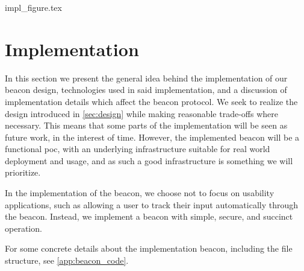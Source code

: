 {impl_figure.tex} %
\section{Implementation}%
\label{sec:implementation}

In this section we present the general idea behind the implementation of our beacon design, technologies used in said implementation, and a discussion of implementation details which affect the beacon protocol.
We seek to realize the design introduced in \cref{sec:design} while making reasonable trade-offs where necessary.
This means that some parts of the implementation will be seen as future work, in the interest of time.
However, the implemented beacon will be a functional \gls{poc}, with an underlying infrastructure suitable for real world deployment and usage, and as such a good infrastructure is something we will prioritize.

In the implementation of the beacon, we choose not to focus on usability applications, such as allowing a user to track their input automatically through the beacon.
Instead, we implement a beacon with simple, secure, and succinct operation.

For some concrete details about the implementation beacon, including the file structure, see \vref{app:beacon_code}.

